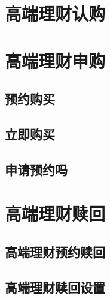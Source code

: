 
\section{高端理财认购} 
\label{sec:trade_vip_buy}


\section{高端理财申购} 
\label{sec:trade_vip_charge}

\subsection{预约购买} 
\label{sub:trade_vip_prebuy}


\subsection{立即购买} 
\label{sub:trade_vip_qbuy}


\subsection{申请预约吗} 
\label{sub:trade_vip_precode}


\section{高端理财赎回} 
\label{sec:trade_vip_redemp}

\subsection{高端理财预约赎回} 
\label{sub:trade_vip_redemp_pre}


\subsection{高端理财赎回设置} 
\label{sub:trade_vip_redemp_setting}

